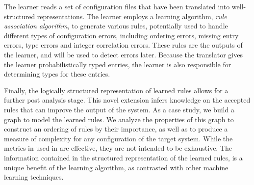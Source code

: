 The learner reads a set of configuration  files that have been translated
into well-structured representations. 
The learner employs a learning algorithm, {\em rule association 
algorithm}, to generate various rules,
potentially used to handle different types of configuration errors,
including ordering errors, missing entry errors,
type errors and integer correlation errors.
These rules are the outputs of the learner, 
and will be used to detect errors later.
Because the translator gives the learner probabilistically typed entries,
the learner is also responsible for determining types for these entries.

Finally, the logically structured representation of learned rules allows for a further post analysis stage.
This novel extension infers knowledge on the accepted rules that can improve the output of the system.
As a case study, we build a graph to model the learned rules.
We analyze the properties of this graph to construct an ordering of rules by their importance, 
  as well as to produce a measure of complexity for any configuration of the target system.
While the metrics in used in \app are effective, they are not intended to be exhaustive.
The information contained in the structured representation of the learned rules, 
  is a unique benefit of the learning algorithm, as contrasted with other machine learning techniques.

